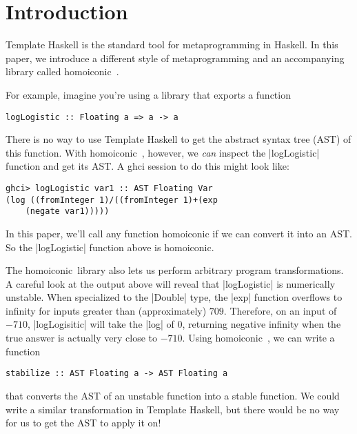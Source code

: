 \documentclass[preprint]{sigplanconf}
\theoremstyle{definition}
\newcommand{\homoiconic}{{\ttfamily homoiconic}~}
\begin{document}



\section{Introduction}

Template Haskell \cite{sheard2002template} is the standard tool for metaprogramming in Haskell.
In this paper, we introduce a different style of metaprogramming and an accompanying library called \homoiconic.

For example, imagine you're using a library that exports a function
\begin{lstlisting}
logLogistic :: Floating a => a -> a
\end{lstlisting}
There is no way to use Template Haskell to get the abstract syntax tree (AST) of this function.
With \homoiconic, however, we \emph{can} inspect the |logLogistic| function and get its AST.
A ghci session to do this might look like:
\begin{lstlisting}
ghci> logLogistic var1 :: AST Floating Var
(log ((fromInteger 1)/((fromInteger 1)+(exp
    (negate var1)))))
\end{lstlisting}
In this paper, we'll call any function homoiconic if we can convert it into an AST.
So the |logLogistic| function above is homoiconic.

The \homoiconic library also lets us perform arbitrary program transformations.
A careful look at the output above will reveal that |logLogistic| is numerically unstable.
When specialized to the |Double| type,
the |exp| function overflows to infinity for inputs greater than (approximately) $709$.
Therefore, on an input of $-710$,
|logLogisitic| will take the |log| of 0,
returning negative infinity when the true answer is actually very close to $-710$.
Using \homoiconic, we can write a function
\begin{lstlisting}
stabilize :: AST Floating a -> AST Floating a
\end{lstlisting}
that converts the AST of an unstable function into a stable function.
We could write a similar transformation in Template Haskell,
but there would be no way for us to get the AST to apply it on!
\end{document}
